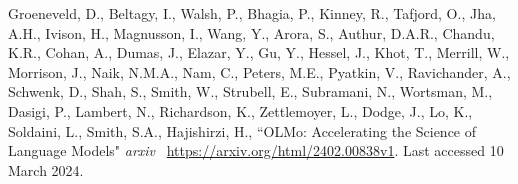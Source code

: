 \documentclass{article}
\begin{document}
\newpage

\begin{thebibliography}{9}

 Groeneveld, D., Beltagy, I., Walsh, P., Bhagia, P., Kinney, R., Tafjord, O., Jha, A.H., Ivison, H., Magnusson, I., Wang, Y., Arora, S., Authur, D.A.R., Chandu, K.R., Cohan, A., Dumas, J., Elazar, Y., Gu, Y., Hessel, J., Khot, T., Merrill, W., Morrison, J., Naik, N.M.A., Nam, C., Peters, M.E., Pyatkin, V., Ravichander, A., Schwenk, D., Shah, S., Smith, W., Strubell, E., Subramani, N., Wortsman, M., Dasigi, P., Lambert, N., Richardson, K., Zettlemoyer, L., Dodge, J., Lo, K., Soldaini, L., Smith, S.A., Hajishirzi, H., ``OLMo: Accelerating the Science of Language Models" \emph{arxiv}
 \url{https://arxiv.org/html/2402.00838v1}. Last accessed 10 March 2024.

\end{thebibliography}
\end{document}
